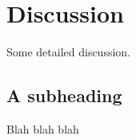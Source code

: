 \center

\section{Discussion}

\raggedright

Some detailed discussion.

\subsection{A subheading}
Blah blah blah
